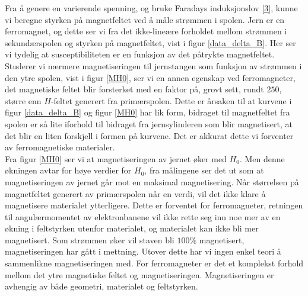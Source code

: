 \documentclass[%
 reprint,
 amsmath,amssymb,
 aps,
 norsk,
]{revtex4-1}
\begin{document}
Fra å genere en varierende spenning, og bruke Faradays induksjonslov \eqref{3}, kunne vi beregne styrken på magnetfeltet ved å måle strømmen i spolen. Jern er en ferromagnet, og dette ser vi fra det ikke-lineære forholdet mellom strømmen i sekundærspolen og styrken på magnetfeltet, vist i figur \vref{data_delta_B}. Her ser vi tydelig at susceptibiliteten er en funksjon av det påtrykte magnetfeltet. Studerer vi nærmere magnetiseringen til jernstangen som funksjon av strømmen i den ytre spolen, vist i figur \vref{MH0}, ser vi en annen egenskap ved ferromagneter, det magnetiske feltet blir forsterket med en faktor på, grovt sett, rundt $250$, større enn $H$-feltet generert fra primærspolen. Dette er årsaken til at kurvene i figur \vref{data_delta_B} og figur \vref{MH0} har lik form, bidraget til magnetfeltet fra spolen er så lite iforhold til bidraget fra jernsylinderen som blir magnetisert, at det blir en liten forskjell i formen på kurvene. Det er akkurat dette vi forventer av ferromagnetiske materialer.\\
Fra figur \vref{MH0} ser vi at magnetiseringen av jernet øker med $H_0$. Men denne økningen avtar for høye verdier for $H_0$, fra målingene ser det ut som at magnetiseringen av jernet går mot en maksimal magnetisering. Når størrelsen på magnetfeltet generert av primærspolen når en verdi, vil det ikke klare å magnetisere materialet ytterligere. Dette er forventet for ferromagneter, retningen til angulærmomentet av elektronbanene vil ikke rette seg inn noe mer av en økning i feltstyrken utenfor materialet, og materialet kan ikke bli mer magnetisert. Som strømmen øker vil staven bli $100\%$ magnetisert, magnetiseringen har gått i mettning. Utover dette har vi ingen enkel teori å sammenlikne magnetiseringen med. For ferromagneter er det et komplekst forhold mellom det ytre magnetiske feltet og magnetiseringen. Magnetiseringen er avhengig av både geometri, materialet og feltstyrken.
\end{document}
